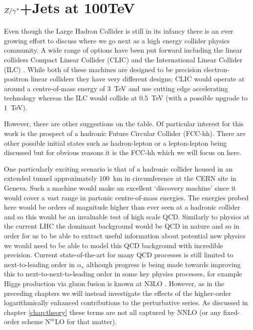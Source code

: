 
\chapter{$Z/\gamma^*$+Jets at 100TeV}
\label{chap:100TeV}

	Even though the Large Hadron Collider is still in its infancy there is an ever growing effort to discuss
	where we go next as a high energy collider physics community.  A wide range of options have been put forward
	including the linear colliders Compact Linear Collider (CLIC) \cite{Abramowicz:2013tzc} and the International
	Linear Collider (ILC) \cite{BrauJames:2007aa}.  While both of these machines are designed to be precision
	electron-positron linear colliders they have very different designs; CLIC would operate at around a
	centre-of-mass energy of $3$~TeV and use cutting edge accelerating technology whereas the ILC would collide
	at $0.5$~TeV (with a possible upgrade to $1$~TeV).

	However, there are other suggestions on the table.  Of particular interest for this work is the prospect
	of a hadronic Future Circular Collider (FCC-hh).  There are other possible initial states such as
	hadron-lepton or a lepton-lepton being discussed but for obvious reasons it is the FCC-hh which we will
	focus on here.

	One particularly exciting scenario is that of a \htev hadronic collider housed in an extended tunnel
	approximately $100$~km in circumference at the CERN site in Geneva.  Such a machine would make an
	excellent `discovery machine' since it would cover a vast range in partonic centre-of-mass energies.
	The energies probed here would be orders of magnitude higher than ever seen at a hadronic collider
	and so this would be an invaluable test of high scale QCD.  Similarly to physics at the current LHC
	the dominant background would be QCD in nature and so in order for us to be able to extract useful
	information about potential new physics we would need to be able to model this QCD background with
	incredible precision.  Current state-of-the-art for many QCD processes is still limited to next-to-leading
	order in $\alpha_s$ although progress is being made towards improving this to next-to-next-to-leading
	order in some key physics processes, for example Higgs production via gluon fusion is known at N3LO \cite{Anastasiou:2015ema}.
	However, as in the preceding chapters we will instead investigate the effects of the higher-order
	logarithmically enhanced contributions to the perturbative series.  As discussed in chapter \ref{chap:theory}
	these terms are not all captured by NNLO (or any fixed-order scheme $\text{N}^m$LO for that matter).

